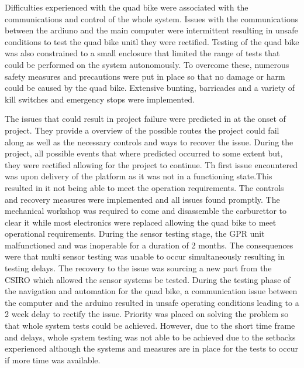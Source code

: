 \documentclass[main.tex]{subfiles}
\begin{document}
Difficulties experienced with the quad bike were associated with the communications and control of the  whole system. Issues with the communications between the ardiuno and the main computer were intermittent resulting in unsafe conditions to test the quad bike unitl they were rectified. Testing of the quad bike was also constrained to a small enclosure that limited the range of tests that could be performed on the system autonomously. To overcome these, numerous safety measures and precautions were put in place so that no damage or harm could be caused by the quad bike. Extensive bunting, barricades and a variety of kill switches and emergency stops were implemented.

The issues that could result in project failure were predicted in  at the onset of project. They provide a overview of the possible routes the project could fail along as well as the necessary controls and ways to recover the issue. 
During the project, all possible events that where predicted occurred to some extent but, they were rectified allowing for the project to continue. 
Th first issue encountered was upon delivery of the platform as it was not in a functioning state.This resulted in it not being able to meet the operation requirements. The controls and recovery measures were implemented and all issues found promptly. The mechanical workshop was required to come and disassemble the carburettor to clear it while most electronics were replaced allowing the quad bike to meet operational requirements.
During the sensor testing stage, the GPR unit malfunctioned and was inoperable for a duration of 2 months. The consequences were that multi sensor testing  was unable to occur simultaneously resulting in testing delays. 
The recovery to the issue was sourcing a new part from the CSIRO which allowed the sensor systems be tested. 
During the testing phase of the navigation and automation for the quad bike, a communication issue between the computer and the arduino resulted in unsafe operating conditions leading to a 2 week delay to rectify the issue. 
Priority was placed on solving the problem so that whole system tests could be achieved. 
However, due to the short time frame and delays, whole system testing was not able to be achieved due to the setbacks experienced although the systems and measures are in place for the tests to occur if more time was available.  
\end{document}
